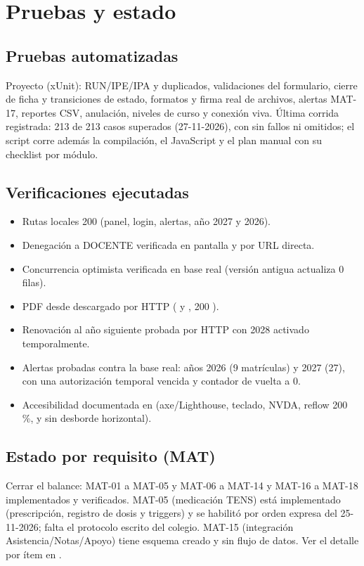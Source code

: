 \section{Pruebas y estado}

\subsection{Pruebas automatizadas}

Proyecto  (xUnit): RUN/IPE/IPA y duplicados,
validaciones del formulario, cierre de ficha y transiciones de estado,
formatos y firma real de archivos, alertas MAT-17, reportes CSV, anulación,
niveles de curso y conexión viva. Última corrida registrada: 213 de 213 casos
superados (27-11-2026), con  sin fallos ni omitidos; el
script  corre además la compilación,
el JavaScript y el plan manual con su checklist por módulo.

\subsection{Verificaciones ejecutadas}

\begin{itemize}[leftmargin=*,itemsep=0.2em]
\item Rutas locales 200 (panel, login, alertas, año 2027 y 2026).
\item Denegación a DOCENTE verificada en pantalla y por URL directa.
\item Concurrencia optimista verificada en base real (versión antigua
  actualiza 0 filas).
\item PDF desde  descargado por HTTP
  ( y , 200 ).
\item Renovación al año siguiente probada por HTTP con 2028 activado
  temporalmente.
\item Alertas probadas contra la base real: años 2026 (9 matrículas) y 2027
  (27), con una autorización temporal vencida y contador de vuelta a 0.
\item Accesibilidad documentada en  (axe/Lighthouse,
  teclado, NVDA, reflow 200\,\%,  y
   sin desborde horizontal).
\end{itemize}

\subsection{Estado por requisito (MAT)}

Cerrar el balance: MAT-01 a MAT-05 y MAT-06 a MAT-14 y MAT-16 a MAT-18
implementados y verificados. MAT-05 (medicación TENS) está implementado
(prescripción, registro de dosis y triggers) y se habilitó por orden expresa
del 25-11-2026; falta el protocolo escrito del colegio. MAT-15 (integración
Asistencia/Notas/Apoyo) tiene esquema creado y sin flujo de datos. Ver el detalle por ítem en
.
